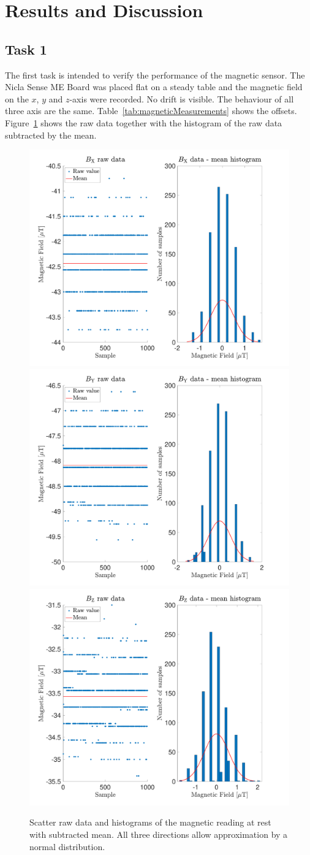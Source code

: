 \documentclass[DIV=14]{scrartcl}
\begin{document}
    \section{Results and Discussion}

    \subsection*{Task 1}

    The first task is intended to verify the performance of the magnetic sensor.
    The Nicla Sense ME Board was placed flat on a steady table and the magnetic field on the $x$, $y$ and $z$-axis were recorded.
    No drift is visible.
    The behaviour of all three axis are the same.
    Table~\ref{tab:magneticMeasurements} shows the offsets.
    Figure~\ref{fig:magneticFieldHist} shows the raw data together with the histogram of the raw data subtracted by the mean.

    \begin{figure}[h]

        \centering
        \includegraphics[width=.45\textwidth]{plots/plotMagFieldX}\hfill
        \includegraphics[width=.45\textwidth]{plots/plotMagFieldY}\vspace{1em}
        \includegraphics[width=.45\textwidth]{plots/plotMagFieldZ}\hfill
        \caption{Scatter raw data and histograms of the magnetic reading at rest with subtracted mean. All three directions allow approximation by a normal distribution.}
        \label{fig:magneticFieldHist}
    \end{figure}
\end{document}

